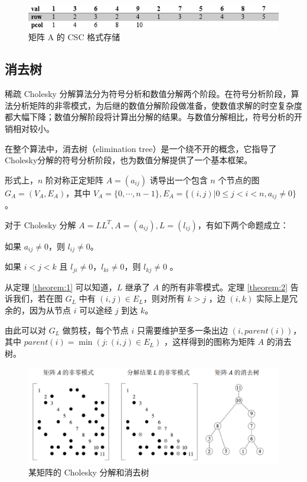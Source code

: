 \begin{figure}
  \centering
  \includegraphics[width=0.8\linewidth]{figures/稀疏矩阵.png}
  \caption{矩阵 A 的 CSC 格式存储}
  \label{fig:4.1}
\end{figure}

\subsection{消去树}

稀疏 Cholesky 分解算法分为符号分析和数值分解两个阶段。在符号分析阶段，算法分析矩阵的非零模式，为后继的数值分解阶段做准备，使数值求解的时空复杂度都大幅下降；数值分解阶段将计算出分解的结果。与数值分解相比，符号分析的开销相对较小。

在整个算法中，消去树（elimination tree）是一个绕不开的概念，它指导了Cholesky分解的符号分析阶段，也为数值分解提供了一个基本框架。

形式上，$n$ 阶对称正定矩阵 $A=(a_{ij})$ 诱导出一个包含 $n$ 个节点的图 $G_A=(V_A, E_A)$，其中 $V_A=\{0,⋯,n-1\},E_A=\{(i,j)|0≤ j<i<n,  a_{ij}≠0\}$ 。

对于 Cholesky 分解 $A=LL^T, A=(a_{ij}), L=(l_{ij})$，有如下两个命题成立：

\begin{theorem}\label{theorem:1} 如果 $ a_{ij}\ne0 $，则 $l_{ij}\ne 0$。\end{theorem}
\begin{theorem}\label{theorem:2} 如果 $i<j<k$ 且  $l_{ji}\ne 0$，$l_{ki}\ne 0$，则 $l_{kj}\ne 0$ 。\end{theorem}

从定理 \ref{theorem:1} 可以知道，$L$ 继承了 $A$ 的所有非零模式。定理 \ref{theorem:2} 告诉我们，若在图 $G_L$ 中有 $(i, j)\in E_L$，则对所有 $k>j$ ，边 $(i, k)$ 实际上是冗余的，因为从节点 $i$ 可以途经 $j$ 到达 $k$。

由此可以对 $G_L$ 做剪枝，每个节点 $i$ 只需要维护至多一条出边 $(i,parent(i))$，其中 $parent(i)=\min(j:(i,j)\in E_L)$ ，这样得到的图称为矩阵 $A$ 的消去树。

\begin{figure}
  \centering
  \includegraphics[width=0.8\linewidth]{figures/消去树.png}
  \caption{某矩阵的 Cholesky 分解和消去树}
  \label{fig:4.2}
\end{figure}

